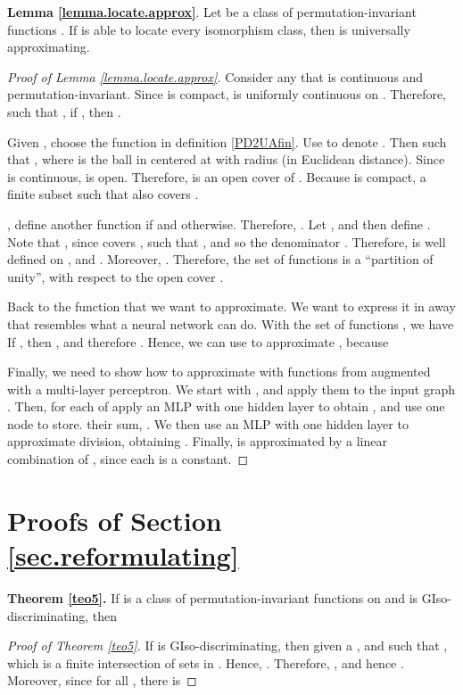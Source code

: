 \documentclass{article}
\begin{document}
\textbf{Lemma \ref{lemma.locate.approx}}.
Let  be a class of permutation-invariant functions . 
If  is able to locate every isomorphism class, then  is universally approximating.

\begin{proof}[Proof of Lemma \ref{lemma.locate.approx}]
Consider any  that is continuous and permutation-invariant. Since  is compact,  is uniformly continuous on . Therefore,  such that , if , then .

Given , choose the function  in definition \ref{PD2UAfin}. Use  to denote . Then  such that , where  is the ball in  centered at  with radius  (in Euclidean distance). Since  is continuous,  is open. Therefore,  is an open cover of . Because  is compact,  a finite subset  such that  also covers .

, define another function  if  and  otherwise. Therefore, . Let , and then define . Note that , since  covers ,  such that , and so the denominator . Therefore,  is well defined on , and . Moreover, . Therefore, the set of functions  is a ``partition of unity'', with respect to the open cover .

Back to the function  that we want to approximate. We want to express it in away that resembles what a neural network can do. With the set of functions , we have 
If , then , and therefore . Hence, we can use  to approximate , because


Finally, we need to show how to approximate  with functions from  augmented with a multi-layer perceptron. We start with , and apply them to the input graph . Then, for each of  apply an MLP with one hidden layer to obtain , and use one node to store. their sum, . We then use an MLP with one hidden layer to approximate division, obtaining . Finally,  is approximated by a linear combination of , since each  is a constant.

\end{proof}

\section{Proofs of Section \ref{sec.reformulating}} \label{sec.proofs.reformulating}
\textbf{Theorem \ref{teo5}.}
If  is a class of permutation-invariant functions on  and  is GIso-discriminating, then 

\begin{proof}[Proof of Theorem \ref{teo5}]
If  is GIso-discriminating, then given a ,  and  such that , which is a finite intersection  of sets in . Hence, . Therefore, , and hence . Moreover, since  for all , there is 
\end{proof}
\end{document}

